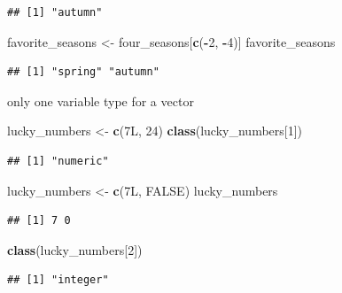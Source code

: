 \documentclass[
]{book}
\newenvironment{Shaded}{\begin{snugshade}}{\end{snugshade}}
\newcommand{\ConstantTok}[1]{\textcolor[rgb]{0.56,0.35,0.01}{#1}}
\newcommand{\DataTypeTok}[1]{\textcolor[rgb]{0.13,0.29,0.53}{#1}}
\newcommand{\DecValTok}[1]{\textcolor[rgb]{0.00,0.00,0.81}{#1}}
\newcommand{\FunctionTok}[1]{\textcolor[rgb]{0.13,0.29,0.53}{\textbf{#1}}}
\newcommand{\NormalTok}[1]{#1}
\newcommand{\OtherTok}[1]{\textcolor[rgb]{0.56,0.35,0.01}{#1}}
\newcommand{\SpecialCharTok}[1]{\textcolor[rgb]{0.81,0.36,0.00}{\textbf{#1}}}
\theoremstyle{definition}
\theoremstyle{definition}
\theoremstyle{definition}
\theoremstyle{definition}
\theoremstyle{remark}
\begin{document}
\begin{verbatim}
## [1] "autumn"
\end{verbatim}

\begin{Shaded}
\begin{Highlighting}[]
\NormalTok{favorite\_seasons }\OtherTok{\textless{}{-}}\NormalTok{ four\_seasons[}\FunctionTok{c}\NormalTok{(}\SpecialCharTok{{-}}\DecValTok{2}\NormalTok{, }\SpecialCharTok{{-}}\DecValTok{4}\NormalTok{)]}
\NormalTok{favorite\_seasons}
\end{Highlighting}
\end{Shaded}

\begin{verbatim}
## [1] "spring" "autumn"
\end{verbatim}

only one variable type for a vector

\begin{Shaded}
\begin{Highlighting}[]
\NormalTok{lucky\_numbers }\OtherTok{\textless{}{-}} \FunctionTok{c}\NormalTok{(}\DecValTok{7}\DataTypeTok{L}\NormalTok{, }\DecValTok{24}\NormalTok{)}
\FunctionTok{class}\NormalTok{(lucky\_numbers[}\DecValTok{1}\NormalTok{])}
\end{Highlighting}
\end{Shaded}

\begin{verbatim}
## [1] "numeric"
\end{verbatim}

\begin{Shaded}
\begin{Highlighting}[]
\NormalTok{lucky\_numbers }\OtherTok{\textless{}{-}} \FunctionTok{c}\NormalTok{(}\DecValTok{7}\DataTypeTok{L}\NormalTok{, }\ConstantTok{FALSE}\NormalTok{)}
\NormalTok{lucky\_numbers}
\end{Highlighting}
\end{Shaded}

\begin{verbatim}
## [1] 7 0
\end{verbatim}

\begin{Shaded}
\begin{Highlighting}[]
\FunctionTok{class}\NormalTok{(lucky\_numbers[}\DecValTok{2}\NormalTok{])}
\end{Highlighting}
\end{Shaded}

\begin{verbatim}
## [1] "integer"
\end{verbatim}
\end{document}
